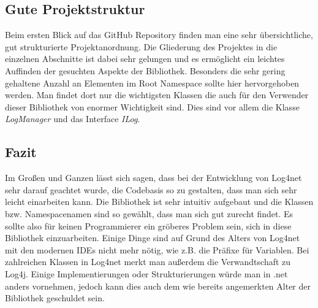 \subsection{Gute Projektstruktur}
Beim ersten Blick auf das GitHub Repository finden man eine sehr übersichtliche, gut strukturierte Projektanordnung. Die Gliederung des Projektes in die einzelnen Abschnitte ist dabei sehr gelungen und es ermöglicht ein leichtes Auffinden der gesuchten Aspekte der Bibliothek. Besonders die sehr gering gehaltene Anzahl an Elementen im Root Namespace sollte hier hervorgehoben werden. Man findet dort nur die wichtigsten Klassen die auch für den Verwender dieser Bibliothek von enormer Wichtigkeit sind. Dies sind vor allem die Klasse \textit{LogManager} und das Interface \textit{ILog}.

\subsection{Fazit}
Im Großen und Ganzen lässt sich sagen, dass bei der Entwicklung von Log4net sehr darauf geachtet wurde, die Codebasis so zu gestalten, dass man sich sehr leicht einarbeiten kann. Die Bibliothek ist sehr intuitiv aufgebaut und die Klassen bzw. Namespacenamen sind so gewählt, dass man sich gut zurecht findet. Es sollte also für keinen Programmierer ein gröberes Problem sein, sich in diese Bibliothek einzuarbeiten. Einige Dinge sind auf Grund des Alters von Log4net mit den modernen IDEs nicht mehr nötig, wie z.B. die Präfixe für Variablen. Bei zahlreichen Klassen in Log4net merkt man außerdem die Verwandtschaft zu Log4j. Einige Implementierungen oder Strukturierungen würde man in .net anders vornehmen, jedoch kann dies auch dem wie bereits angemerkten Alter der Bibliothek geschuldet sein.